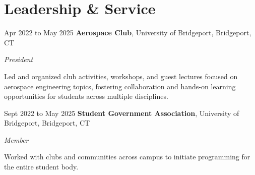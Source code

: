 \section{Leadership \& Service} 
    \begin{twocolentry}{Apr 2022 to May 2025}
        \textbf{Aerospace Club}, University of Bridgeport, Bridgeport, CT
    \end{twocolentry}
    \textit{President}
    \vspace{0.10 cm}
    \begin{onecolentry}
        \begin{highlights}
            \item Led and organized club activities, workshops, and guest lectures focused on aerospace engineering topics, fostering collaboration and hands-on learning opportunities for students across multiple disciplines.
        \end{highlights}
    \end{onecolentry}

    \vspace{0.10 cm}

    \begin{twocolentry}{Sept 2022 to May 2025}
        \textbf{Student Government Association}, University of Bridgeport, Bridgeport, CT
    \end{twocolentry}
    \textit{Member}
    \vspace{0.10 cm}
    \begin{onecolentry}
        \begin{highlights}
            \item Worked with clubs and communities across campus to initiate programming for the entire student body.
        \end{highlights}
    \end{onecolentry}